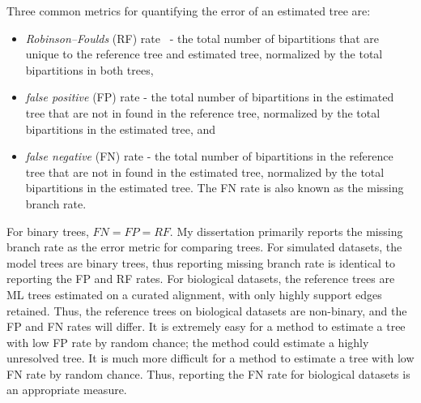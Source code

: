Three common metrics for quantifying the error of an estimated tree are:
\begin{itemize}
\item \emph{Robinson–Foulds} (RF) rate~\cite{RF} - the total number of bipartitions that are unique to the reference tree and estimated tree, normalized by the total bipartitions in both trees,
\item \emph{false positive} (FP) rate - the total number of bipartitions in the estimated tree that are not in found in the reference tree, normalized by the total bipartitions in the estimated tree, and
\item \emph{false negative} (FN) rate - the total number of bipartitions in the reference tree that are not in found in the estimated tree, normalized by the total bipartitions in the estimated tree.  The FN rate is also known as the missing branch rate.
\end{itemize}

For binary trees, $FN=FP=RF$.  My dissertation primarily reports the missing branch rate as the error metric for comparing trees.  For simulated datasets, the model trees are binary trees, thus reporting missing branch rate is identical to reporting the FP and RF rates.  For biological datasets, the reference trees are ML trees estimated on a curated alignment, with only highly support edges retained.  Thus, the reference trees on biological datasets are non-binary, and the FP and FN rates will differ.  It is extremely easy for a method to estimate a tree with low FP rate by random chance; the method could estimate a highly unresolved tree.  It is much more difficult for a method to estimate a tree with low FN rate by random chance.  Thus, reporting the FN rate for biological datasets is an appropriate measure. 



